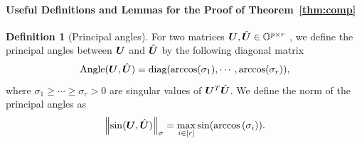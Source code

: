 \documentclass[lettersize,onecolumn,journal]{IEEEtran}
\theoremstyle{definition}
\theoremstyle{definition}
\newtheorem{defn}{Definition}
\newcommand{\of}[1]{\left(#1\right)}
\def\fixme#1#2{\textbf{\color{red}[FIXME (#1): #2]}}
\begin{document}
\paragraph{Useful Definitions and Lemmas for the Proof of Theorem~\ref{thm:comp}} 
\begin{defn}[Principal angles] For two matrices $\bm{U}, \hat {\bm{U}} \in \mathbb{O}^{p \times r}$ %
, we define the principal angles between $\bm{U}$ and $\hat {\bm{U}}$ by the following diagonal matrix
\begin{equation}
    \text{Angle}(\bm{U}, \hat {\bm{U}}) = \text{diag}( \arccos(\sigma_1), \cdots, \arccos (\sigma_r) ),
\end{equation}
where $\sigma_1 \geq \cdots \geq \sigma_r>0$ are singular values of $\bm{U}^T \hat {\bm{U}}$. 
We define the norm of the principal angles as 
\begin{equation}
     \onorm{\sin(\mU, \hat \mU)}_{\sigma} = \max_{i \in [r]} \sin ( \arccos \of{ \sigma_i} ).
\end{equation}




\end{defn}



\end{document}
